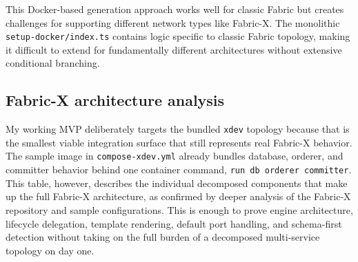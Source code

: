This Docker-based generation approach works well for classic Fabric but creates challenges for supporting different network types like Fabric-X. The monolithic \texttt{setup-docker/index.ts} contains logic specific to classic Fabric topology, making it difficult to extend for fundamentally different architectures without extensive conditional branching.

\subsection{Fabric-X architecture analysis}

My working MVP deliberately targets the bundled \texttt{xdev} topology because that is the smallest viable integration surface that still represents real Fabric-X behavior. The sample image in \texttt{compose-xdev.yml} already bundles database, orderer, and committer behavior behind one container command, \texttt{run db orderer committer}. This table, however, describes the individual decomposed components that make up the full Fabric-X architecture, as confirmed by deeper analysis of the Fabric-X repository and sample configurations. This is enough to prove engine architecture, lifecycle delegation, template rendering, default port handling, and schema-first detection without taking on the full burden of a decomposed multi-service topology on day one.


